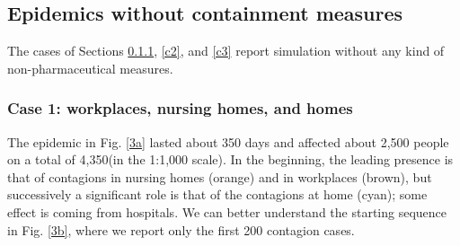 \documentclass[graybox]{svmult}
\begin{document}
\subsection{Epidemics without containment measures}

The cases of Sections \ref{c1}, \ref{c2}, and \ref {c3} report simulation without any kind of non-pharmaceutical measures.


\subsubsection{Case 1: workplaces, nursing homes, and homes}
\label{c1}

The epidemic in Fig. \ref{3a} lasted about 350 days and affected about 2,500 people on a total of 4,350(in the 1:1,000 scale). In the beginning, the leading presence is that of contagions in nursing homes (orange) and in workplaces (brown), but successively a significant role is that of the contagions at home (cyan); some effect is coming from hospitals. We can better understand the starting sequence in Fig. \ref{3b}, where we report only the first 200 contagion cases.
  

\end{document}

